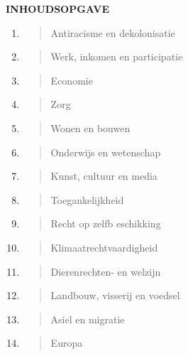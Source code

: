 \textbf{INHOUDSOPGAVE}

\begin{enumerate}
\def\labelenumi{\arabic{enumi}.}
\item
  \begin{quote}
  Antiracisme en dekolonisatie
  \end{quote}
\item
  \begin{quote}
  Werk, inkomen en participatie
  \end{quote}
\item
  \begin{quote}
  Economie
  \end{quote}
\item
  \begin{quote}
  Zorg
  \end{quote}
\item
  \begin{quote}
  Wonen en bouwen
  \end{quote}
\item
  \begin{quote}
  Onderwijs en wetenschap
  \end{quote}
\item
  \begin{quote}
  Kunst, cultuur en media
  \end{quote}
\item
  \begin{quote}
  Toegankelijkheid
  \end{quote}
\item
  \begin{quote}
  Recht op zelfb eschikking
  \end{quote}
\item
  \begin{quote}
  Klimaatrechtvaardigheid
  \end{quote}
\item
  \begin{quote}
  Dierenrechten- en welzijn
  \end{quote}
\item
  \begin{quote}
  Landbouw, visserij en voedsel
  \end{quote}
\item
  \begin{quote}
  Asiel en migratie
  \end{quote}
\item
  \begin{quote}
  Europa
  \end{quote}

\end{enumerate}
